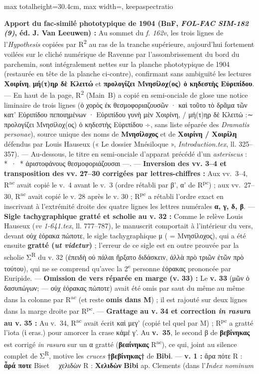 \documentclass[11pt,twoside]{book}
\newcommand{\italique}[1]{\textit{#1}}
\providecommand{\ieme}{}\renewcommand{\ieme}{\textsuperscript{e}\xspace}
\newcommand{\auDessus}[2]{\leavevmode\vbox{\offinterlineskip\ialign{\hfil##\hfil\cr\fontsize{5.5pt}{6pt}\selectfont #2\cr\noalign{\kern0.1ex}#1\cr}}}
\newcommand{\expo}[1]{\textsuperscript{#1}}
\newcommand{\Rdeux}{R\expo{2}}
\newcommand{\Rpc}{R\expo{pc}}
\newcommand{\Rac}{R\expo{ac}}
\newcommand{\Mon}{M}
\newcommand{\latin}[1]{\textit{#1}}
\newcommand{\lecon}[1]{\textbf{#1}}
\newcommand{\espApp}{\ {\color{ruleGold}{\policeFr ∥}}\ }
\begin{document}
\begin{adjustbox}{max totalheight=30.4cm, max width=\textwidth, keepaspectratio}
\begin{minipage}{\textwidth}
{ \textbf{Apport du fac-similé phototypique de 1904 (BnF, \textit{FOL-FAC SIM-182 (9)}, éd. J. Van Leeuwen) :} Au sommet du \textit{f. 162v}, les trois lignes de l'\textit{Hypothesis} copiées par \Rdeux{} au ras de la tranche supérieure, aujourd'hui fortement voilées sur le cliché numérique de Ravenne par l'assombrissement du bord du parchemin, sont intégralement nettes sur la planche phototypique de 1904 (restaurée en tête de la planche ci-contre), confirmant sans ambiguïté les lectures \textbf{Χοιρίνη}, \textbf{μή(τ)ηρ δὲ Κλειτώ} et \textbf{προλογίζει Μνησίλοχ(ος) ὁ κηδεστὴς Εὐριπίδου}. --- En haut de la page, \Rdeux{} (Main~B) a copié en semi-onciale de glose une notice liminaire de trois lignes (ὁ χορὸς ἐκ θεσμοφοριαζουσῶν · καὶ τοῦτο τὸ δρᾶμα τῶν κατ' Εὐριπίδου πεποιημένων · Εὐριπίδου γυνὴ μὲν Χοιρίνη, / μή(τ)ηρ δὲ Κλειτώ :{\policeFr ∼} προλογίζει Μνησίλοχ(ος) ὁ κηδεστὴς Εὐριπίδου {\policeFr ÷}, sans liste séparée des \italique{Dramatis personae}), source unique des noms de \textbf{Μνησίλοχος} et de \textbf{Χοιρίνη / Χοιρίλη} défendus par Louis Hauseux (« Le dossier Mnésiloque », \textit{Introduction.tex}, ll. 325–357). --- Au-dessous, le titre en semi-onciale d'apparat précédé d'un \italique{asteriscus} : *~·~* ἀριστοφάνους θεσμοφοριάζουσαι —. --- \textbf{Inversion des vv. 3–4 et transposition des vv. 27–30 corrigées par lettres-chiffres :} Aux vv.~3–4, \Rac{} avait copié le v.~4 avant le v.~3 (ordre rétabli par β', α' de \Rpc{}) ; aux vv.~27–30, \Rac{} avait copié le v. 28 après le v. 30 ; \Rpc{} a rétabli l'ordre exact en inscrivant à l'extrémité droite des quatre lignes les lettres numérales \textbf{α, γ, δ, β}. --- \textbf{Sigle tachygraphique gratté et scholie au v. 32 :} Comme le relève Louis Hauseux (\textit{vv 1-641.tex}, ll. 777–787), le manuscrit comportait à l'intérieur du vers, devant οὐχ ἑόρακα πώποτε, le sigle tachygraphique μ\auDessus{ν}{Η} (\auDessus{μν}{Η} = Μνησίλοχος), qui a été ensuite \textbf{gratté (\italique{ut videtur})} ; l'erreur de ce sigle est en outre prouvée par la scholie {\policeGr Σ}\expo{R} du v. 32 (ἐπειδὴ οὐ πάλαι ἤρξατο διδάσκειν, ἀλλὰ πρὸ τριῶν ἐτῶν πρὸ τούτου), qui ne se comprend qu'avec la 2\ieme{} personne ἑόρακας prononcée par Euripide. --- \textbf{Omission de vers réparée en marge (v. 33) :} Le \textbf{v. 33} (μῶν ὁ δασυπώγων; --- οὐχ ἑόρακας πώποτε) avait été omis par saut du même au même dans la colonne par \Rac{} (et reste \textbf{omis dans \Mon{}}) ; il est rajouté sur deux lignes dans la marge droite par \Rpc{}. --- \textbf{Grattage au v. 34 et correction \latin{in rasura} au v. 35 :} Au v.~34, \Rac{} avait écrit καὶ μεγ' (copié tel quel par \Mon{}) ; \Rpc{} a gratté l'iota (ὶ eras.) pour amorcer la crase κἀμέ γ'. Au \textbf{v.~35}, le second β de \textbf{βεβίνηκας} est corrigé \latin{in rasura} sur un α gratté (\textbf{βεαίνηκας} \Rac{}), ce qui, joint au silence complet de {\policeGr Σ}\expo{R}, motive les \latin{cruces} \lecon{†βεβίνηκας†} de \lecon{Bibi}. --- \textbf{v. 1 :} ἄρα πότε R : \lecon{ἆρά ποτε} Biset \espApp χελιδὼν R : \lecon{Χελιδὼν} \lecon{Bibi} ap. Clements (dans l'\italique{Index nominum} }
\end{minipage}
\end{adjustbox}
\end{document}
